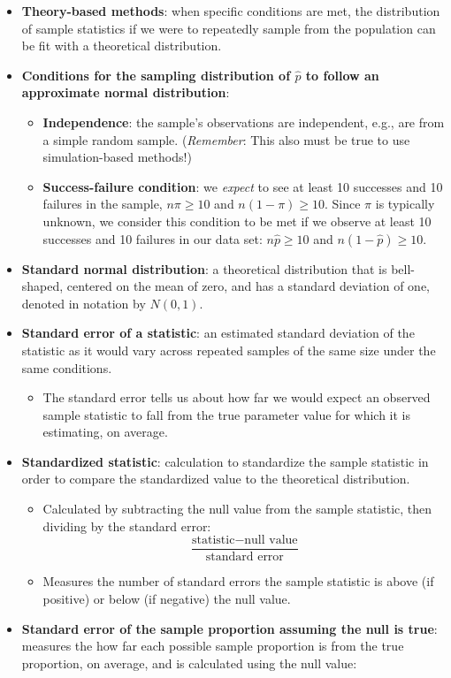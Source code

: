 \documentclass[
]{report}
\providecommand{\tightlist}{%
  \setlength{\itemsep}{0pt}\setlength{\parskip}{0pt}}
\begin{document}
\begin{itemize}
\item
  \textbf{Theory-based methods}: when specific conditions are met, the distribution of sample statistics if we were to repeatedly sample from the population can be fit with a theoretical distribution.
\item
  \textbf{Conditions for the sampling distribution of \(\hat{p}\) to follow an approximate normal distribution}:

  \begin{itemize}
  \item
    \textbf{Independence}: the sample's observations are independent, e.g., are from a simple random sample. (\emph{Remember}: This also must be true to use simulation-based methods!)
  \item
    \textbf{Success-failure condition}: we \emph{expect} to see at least 10 successes and 10 failures in the sample, \(n\pi\geq10\) and \(n(1-\pi)\geq10\). Since \(\pi\) is typically unknown, we consider this condition to be met if we observe at least 10 successes and 10 failures in our data set: \(n\hat{p}\geq10\) and \(n(1-\hat{p})\geq10\).
  \end{itemize}
\item
  \textbf{Standard normal distribution}: a theoretical distribution that is bell-shaped, centered on the mean of zero, and has a standard deviation of one, denoted in notation by \(N(0,1)\).
\item
  \textbf{Standard error of a statistic}: an estimated standard deviation of the statistic as it would vary across repeated samples of the same size under the same conditions.

  \begin{itemize}
  \tightlist
  \item
    The standard error tells us about how far we would expect an observed sample statistic to fall from the true parameter value for which it is estimating, on average.
  \end{itemize}
\item
  \textbf{Standardized statistic}: calculation to standardize the sample statistic in order to compare the standardized value to the theoretical distribution.

  \begin{itemize}
  \item
    Calculated by subtracting the null value from the sample statistic, then dividing by the standard error:
    \[\frac{\text{statistic} - \text{null value}}{\text{standard error}}\]
  \item
    Measures the number of standard errors the sample statistic is above (if positive) or below (if negative) the null value.
  \end{itemize}
\item
  \textbf{Standard error of the sample proportion assuming the null is true}: measures the how far each possible sample proportion is from the true proportion, on average, and is calculated using the null value:
\end{itemize}
\end{document}
